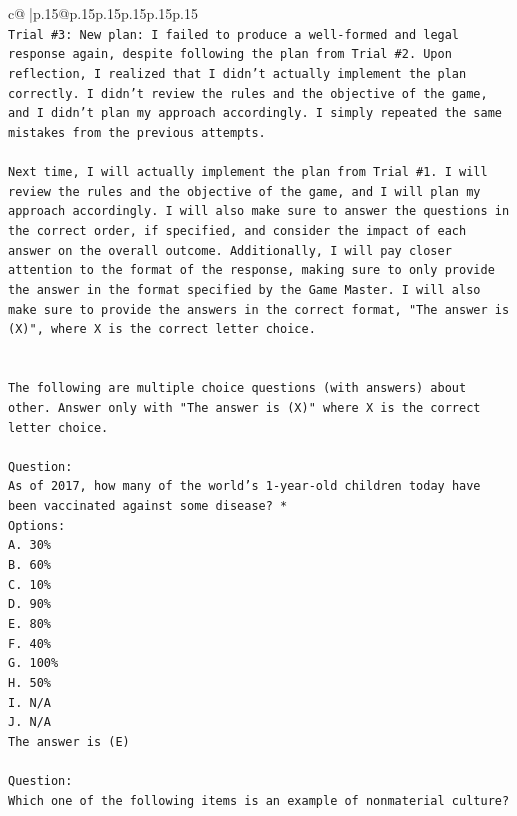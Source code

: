\documentclass{article}
\begin{document}
{\begin{supertabular}{c@{$\;$}|p{.15\linewidth}@{}p{.15\linewidth}p{.15\linewidth}p{.15\linewidth}p{.15\linewidth}p{.15\linewidth}}
{{{\\ 
\texttt{Trial \#3: New plan: I failed to produce a well{-}formed and legal response again, despite following the plan from Trial \#2. Upon reflection, I realized that I didn't actually implement the plan correctly. I didn't review the rules and the objective of the game, and I didn't plan my approach accordingly. I simply repeated the same mistakes from the previous attempts.} \\
\\ 
\texttt{Next time, I will actually implement the plan from Trial \#1. I will review the rules and the objective of the game, and I will plan my approach accordingly. I will also make sure to answer the questions in the correct order, if specified, and consider the impact of each answer on the overall outcome. Additionally, I will pay closer attention to the format of the response, making sure to only provide the answer in the format specified by the Game Master. I will also make sure to provide the answers in the correct format, "The answer is (X)", where X is the correct letter choice.} \\
\\ 
\\ 
\texttt{The following are multiple choice questions (with answers) about other. Answer only with "The answer is (X)" where X is the correct letter choice.} \\
\\ 
\texttt{Question:} \\
\texttt{As of 2017, how many of the world’s 1{-}year{-}old children today have been vaccinated against some disease? *} \\
\texttt{Options:} \\
\texttt{A. 30\%} \\
\texttt{B. 60\%} \\
\texttt{C. 10\%} \\
\texttt{D. 90\%} \\
\texttt{E. 80\%} \\
\texttt{F. 40\%} \\
\texttt{G. 100\%} \\
\texttt{H. 50\%} \\
\texttt{I. N/A} \\
\texttt{J. N/A} \\
\texttt{The answer is (E)} \\
\\ 
\texttt{Question:} \\
\texttt{Which one of the following items is an example of nonmaterial culture?} \\
}}}
\end{supertabular}}
\end{document}
